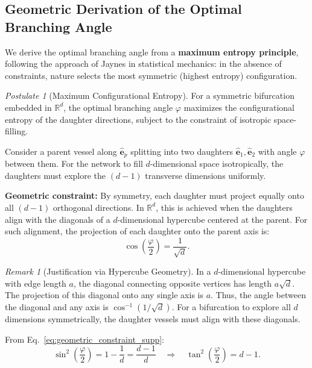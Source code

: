 \documentclass[11pt,a4paper]{article}
\theoremstyle{remark}
\newtheorem{remark}{Remark}
\newtheorem{postulate}[theorem]{Postulate}
\begin{document}
\subsection{Geometric Derivation of the Optimal Branching Angle}
We derive the optimal branching angle from a \textbf{maximum entropy principle},
following the approach of Jaynes in statistical mechanics: in the absence of
constraints, nature selects the most symmetric (highest entropy) configuration.

\begin{postulate}[Maximum Configurational Entropy]
\label{post:max_entropy_supp}
For a symmetric bifurcation embedded in $\mathbb{R}^d$, the optimal branching
angle $\varphi$ maximizes the configurational entropy of the daughter
directions, subject to the constraint of isotropic space-filling.
\end{postulate}

Consider a parent vessel along $\hat{\mathbf{e}}_p$ splitting into two daughters
$\hat{\mathbf{e}}_1, \hat{\mathbf{e}}_2$ with angle $\varphi$ between them. For
the network to fill $d$-dimensional space isotropically, the daughters must
explore the $(d-1)$ transverse dimensions uniformly.

\textbf{Geometric constraint:} By symmetry, each daughter must project equally
onto all $(d-1)$ orthogonal directions. In $\mathbb{R}^d$, this is achieved when
the daughters align with the diagonals of a $d$-dimensional hypercube centered
at the parent. For such alignment, the projection of each daughter onto the
parent axis is:
\begin{equation}
    \cos\left(\frac{\varphi}{2}\right) = \frac{1}{\sqrt{d}}.
    \label{eq:geometric_constraint_supp}
\end{equation}

\begin{remark}[Justification via Hypercube Geometry]
In a $d$-dimensional hypercube with edge length $a$, the diagonal connecting
opposite vertices has length $a\sqrt{d}$. The projection of this diagonal onto
any single axis is $a$. Thus, the angle between the diagonal and any axis is
$\cos^{-1}(1/\sqrt{d})$. For a bifurcation to explore all $d$ dimensions
symmetrically, the daughter vessels must align with these diagonals.
\end{remark}

From Eq.~\eqref{eq:geometric_constraint_supp}:
\begin{equation}
    \sin^2\left(\frac{\varphi}{2}\right) = 1 - \frac{1}{d} = \frac{d-1}{d} \quad \Rightarrow \quad \boxed{\tan^2\left(\frac{\varphi}{2}\right) = d - 1.}
    \label{eq:angle_formula_supp}
\end{equation}
\end{document}
